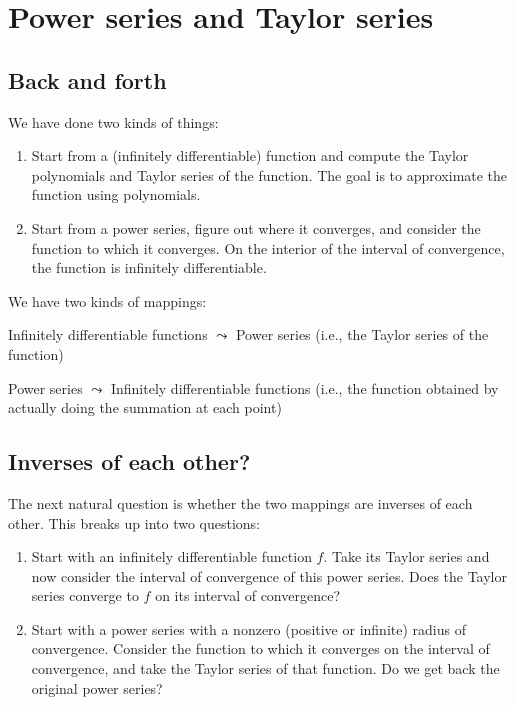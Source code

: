 \documentclass{amsart}
\begin{document}
\section{Power series and Taylor series}

\subsection{Back and forth}

We have done two kinds of things:

\begin{enumerate}
\item Start from a (infinitely differentiable) function and compute
  the Taylor polynomials and Taylor series of the function. The goal
  is to approximate the function using polynomials.
\item Start from a power series, figure out where it converges, and
  consider the function to which it converges. On the interior of the
  interval of convergence, the function is infinitely differentiable.
\end{enumerate}

We have two kinds of mappings:

Infinitely differentiable functions $\leadsto$ Power series (i.e., the Taylor series of the function)

Power series $\leadsto$ Infinitely differentiable functions (i.e., the
function obtained by actually doing the summation at each point)

\subsection{Inverses of each other?}

The next natural question is whether the two mappings are inverses of
each other. This breaks up into two questions:

\begin{enumerate}
\item Start with an infinitely differentiable function $f$. Take its
  Taylor series and now consider the interval of convergence of this
  power series. Does the Taylor series converge to $f$ on its interval
  of convergence?
\item Start with a power series with a nonzero (positive or infinite)
  radius of convergence. Consider the function to which it converges
  on the interval of convergence, and take the Taylor series of that
  function. Do we get back the original power series?
\end{enumerate}
\end{document}

